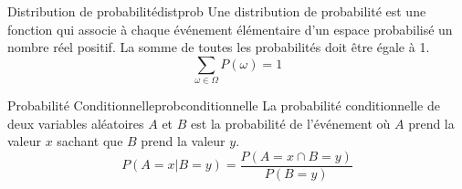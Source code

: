 \begin{definition}{Distribution de probabilité}{distprob}
    Une distribution de probabilité est une fonction qui associe à chaque événement élémentaire 
    d'un espace probabilisé un nombre réel positif. 
    La somme de toutes les probabilités doit être égale à 1.
    \begin{equation}
        \sum_{\omega \in \Omega} P(\omega) = 1
    \end{equation}

\end{definition}

\begin{definition}{Probabilité Conditionnelle}{probconditionnelle}
    La probabilité conditionnelle de deux variables aléatoires $A$ et $B$ est la probabilité de l'événement 
    où $A$ prend la valeur $x$ sachant que $B$ prend la valeur $y$.
    \begin{equation}
        P(A=x | B=y) = \frac{P(A=x\cap B=y)}{P(B=y)}
    \end{equation} 
\end{definition}



